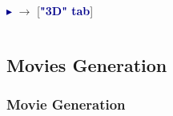 \begin{frame}
\begin{columns}
\begin{column}{5.25cm}
	\vspace{2mm}
        \textcolor{DarkBlue}{$\blacktriangleright$}
         $\rightarrow$ 
		[\textcolor{DarkBlue}{\bf "3D" tab}]
\end{column}
\end{columns}
\end{frame}




\subsection{Movies Generation}

\begin{frame}
\frametitle{Movie Generation}

\end{frame}
